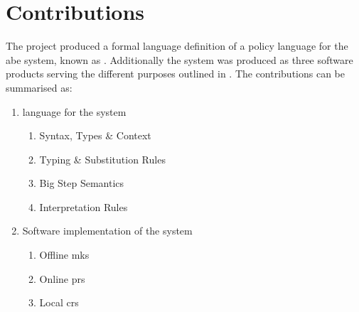\section{Contributions}
\label{sec:intro_contrib}

The project produced a formal language definition of a policy language for the \acrshort{abe} system, known as \thePolicyLang. Additionally the \theResServer system was produced as three software products serving the different purposes outlined in . The contributions can be summarised as:

\begin{enumerate}
  \item \thePolicyLang language for the \theResServer system
  \begin{enumerate}
    \item Syntax, Types \& Context
    \item Typing \& Substitution Rules
    \item Big Step Semantics
    \item Interpretation Rules
  \end{enumerate}
  \item Software implementation of the \theResServer system
  \begin{enumerate}
    \item Offline \acrfull{mks}
    \item Online \acrfull{prs}
    \item Local \acrfull{crs}
  \end{enumerate}
\end{enumerate}
